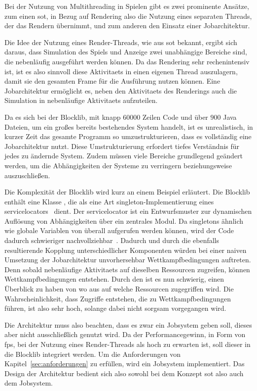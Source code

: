 Bei der Nutzung von Multithreading in Spielen gibt es zwei prominente Ansätze, zum einen \ac{sot}, in Bezug auf Rendering also die Nutzung eines separaten Threads, der das Rendern übernimmt, und zum anderen den Einsatz einer Jobarchitektur.

Die Idee der Nutzung eines Render-Threads, wie aus \ac{sot} bekannt, ergibt sich daraus, dass Simulation des Spiels und Anzeige zwei unabhängige Bereiche sind, die nebenläufig ausgeführt werden können. Da das Rendering sehr rechenintensiv ist, ist es also sinnvoll diese \glspl{Aktivitaet} in einen eigenen Thread auszulagern, damit sie den gesamten Frame für die Ausführung nutzen können. Eine Jobarchitektur ermöglicht es, neben den \glspl{Aktivitaet} des Renderings auch die Simulation in nebenläufige \glspl{Aktivitaet} aufzuteilen. 

Da es sich bei der Blocklib, mit knapp $60000$ Zeilen Code und über $900$ Java Dateien, um ein großes bereits bestehendes System handelt, ist es unrealistisch, in kurzer Zeit das gesamte \gls{Programm} so umzustrukturieren, dass es vollständig eine Jobarchitektur nutzt. Diese Umstrukturierung erfordert tiefes Verständnis für jedes zu ändernde System. Zudem müssen viele Bereiche grundlegend geändert werden, um die Abhängigkeiten der Systeme zu verringern beziehungsweise auszuschließen.

Die Komplexität der Blocklib wird kurz an einem Beispiel erläutert. Die Blocklib enthält eine Klasse \classContext{}, die als eine Art \gls{singleton}-Implementierung eines \glspl{servicelocator}~\cite[S.~301~\psqq]{Nystrom2015} dient. Der \gls{servicelocator} ist ein Entwurfsmuster zur dynamischen Auflösung von Abhängigkeiten über ein zentrales Modul. Da \glspl{singleton} ähnlich wie globale Variablen von überall aufgerufen werden können, wird der Code dadurch schwieriger nachvollziehbar~\cite[S.~108]{Nystrom2015}. Dadurch und durch die ebenfalls resultierende Kopplung unterschiedlicher Komponenten würden bei einer naiven Umsetzung der Jobarchitektur unvorhersehbar Wettkampfbedingungen auftreten.
Denn sobald nebenläufige \glspl{Aktivitaet} auf dieselben Ressourcen zugreifen, können Wettkampfbedingungen entstehen. Durch den \classContext{} ist es nun schwierig, einen Überblick zu haben von wo aus auf welche Ressourcen zugegriffen wird. Die Wahrscheinlichkeit, dass Zugriffe entstehen, die zu Wettkampfbedingungen führen, ist also sehr hoch, solange dabei nicht sorgsam vorgegangen wird.

Die Architektur muss also beachten, dass es zwar ein Jobsystem geben soll, dieses aber nicht ausschließlich genutzt wird. Da der Performancegewinn, in Form von \ac{fps}, bei der Nutzung eines Render-Threads als hoch zu erwarten ist, soll dieser in die Blocklib integriert werden. Um die Anforderungen von Kapitel~\ref{sec:anforderungen} zu erfüllen, wird ein Jobsystem implementiert. Das Design der Architektur bedient sich also sowohl bei dem Konzept \ac{sot} also auch dem Jobsystem.